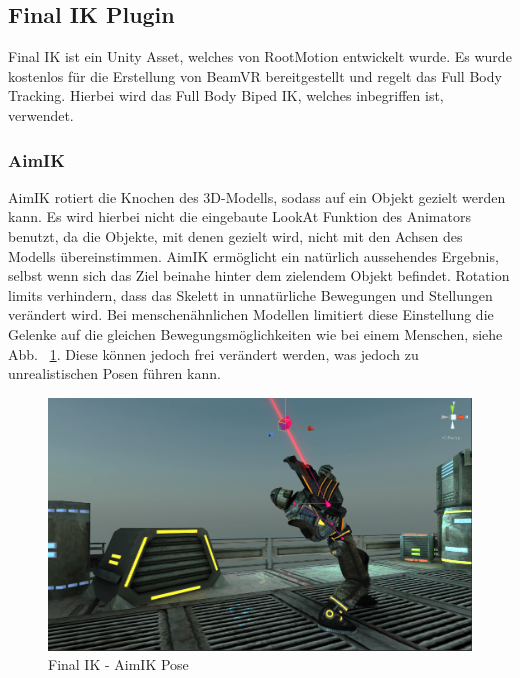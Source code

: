 




\subsection{Final IK Plugin}\label{subsec:final-ik-plugin}

Final IK ist ein Unity Asset, welches von RootMotion entwickelt wurde.
Es wurde kostenlos für die Erstellung von BeamVR bereitgestellt und regelt das Full Body Tracking.
Hierbei wird das Full Body Biped IK, welches inbegriffen ist, verwendet.
~\cite{FinalIK_Overview_2020}

\subsubsection{AimIK}
AimIK rotiert die Knochen des 3D-Modells, sodass auf ein Objekt gezielt werden kann.
Es wird hierbei nicht die eingebaute LookAt Funktion des Animators benutzt, da die Objekte, mit denen gezielt wird, nicht mit den Achsen des Modells übereinstimmen.
AimIK ermöglicht ein natürlich aussehendes Ergebnis, selbst wenn sich das Ziel beinahe hinter dem zielendem Objekt befindet.
Rotation limits verhindern, dass das Skelett in unnatürliche Bewegungen und Stellungen verändert wird.
Bei menschenähnlichen Modellen limitiert diese Einstellung die Gelenke auf die gleichen Bewegungsmöglichkeiten wie bei einem Menschen, siehe Abb. ~\ref{fig:finalIK_aimIK_pose}.
Diese können jedoch frei verändert werden, was jedoch zu unrealistischen Posen führen kann.
\begin {figure}
    \centering
    \includegraphics[scale=0.4]{pics/finalik_aimik_pose}
    \caption{Final IK - AimIK Pose}
    \label{fig:finalIK_aimIK_pose}
\end {figure}

